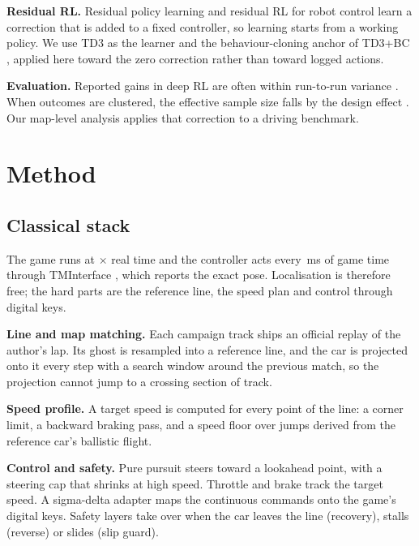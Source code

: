 \documentclass[conference]{IEEEtran}
\begin{document}
\textbf{Residual RL.} Residual policy learning \cite{silver2018residual} and residual RL for robot control
\cite{johannink2019residual} learn a correction that is added to a fixed controller, so learning starts from a
working policy. We use TD3 \cite{fujimoto2018td3} as the learner and the behaviour-cloning anchor of TD3+BC
\cite{fujimoto2021td3bc}, applied here toward the zero correction rather than toward logged actions.

\textbf{Evaluation.} Reported gains in deep RL are often within run-to-run variance
\cite{henderson2018matters,agarwal2021precipice}. When outcomes are clustered, the effective sample size falls by the design effect
\cite{kish1965survey}. Our map-level analysis applies that correction to a driving benchmark.

\section{Method}
\label{sec:method}

\subsection{Classical stack}

The game runs at \GameSpeed{}$\times$ real time and the controller acts every \StepMs\,ms of game time through
TMInterface \cite{tminterface}, which reports the exact pose. Localisation is therefore free; the hard
parts are the reference line, the speed plan and control through digital keys.

\textbf{Line and map matching.} Each campaign track ships an official replay of the author's lap. Its ghost is
resampled into a reference line, and the car is projected onto it every step with a search window around the
previous match, so the projection cannot jump to a crossing section of track.

\textbf{Speed profile.} A target speed is computed for every point of the line: a corner limit, a backward
braking pass, and a speed floor over jumps derived from the reference car's ballistic flight.

\textbf{Control and safety.} Pure pursuit \cite{coulter1992purepursuit} steers toward a lookahead point, with
a steering cap that shrinks at high speed. Throttle and brake track the target speed. A sigma-delta adapter
maps the continuous commands onto the game's digital keys. Safety layers take over when the car leaves the
line (recovery), stalls (reverse) or slides (slip guard).
\end{document}
